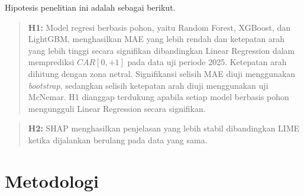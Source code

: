 Hipotesis penelitian ini adalah sebagai berikut.
\begin{quote}
\textbf{H1:} Model regresi berbasis pohon, yaitu Random Forest, XGBoost, dan LightGBM, menghasilkan MAE yang lebih rendah dan ketepatan arah yang lebih tinggi secara signifikan dibandingkan Linear Regression dalam memprediksi $CAR[0,+1]$ pada data uji periode 2025. Ketepatan arah dihitung dengan zona netral. Signifikansi selisih MAE diuji menggunakan \emph{bootstrap}, sedangkan selisih ketepatan arah diuji menggunakan uji McNemar. H1 dianggap terdukung apabila setiap model berbasis pohon mengungguli Linear Regression secara signifikan.
\end{quote}
\begin{quote}
\textbf{H2:} SHAP menghasilkan penjelasan yang lebih stabil dibandingkan LIME ketika dijalankan berulang pada data yang sama.
\end{quote}

\section{Metodologi}

